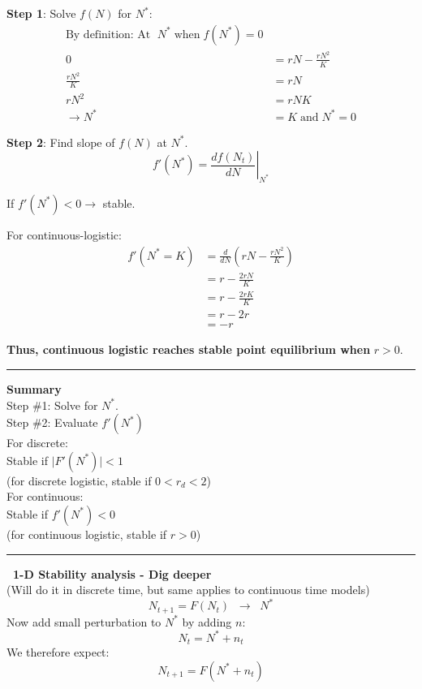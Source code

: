 \documentclass{article}
\newcommand{\ind}{\-\hspace{1cm}}
\begin{document}
\textbf{Step 1}:  Solve $f(N)$ for $N^*$:
\begin{align*}
	\text{By definition:  At }\; N^{*} \; \text{when} \; f(N^*)=0&\\
	0 & = rN-\frac{rN^2}{K}\\
	\frac{rN^2}{K}&=rN\\
	rN^2&=rNK\\
	\to N^*& = K \; \text{and} \; N^* =0	
\end{align*}

\textbf{Step 2}:  Find slope of $f(N)$ at $N^*$.  
\begin{equation*}
	f'(N^*)=\left.\frac{d f(N_t)}{dN}\right\vert_{N^*}
\end{equation*}
\begin{center}
\ind \ind If $ f'(N^*) < 0 \to$ stable.
\end{center}
\ind \ind For continuous-logistic:\\
\begin{align*}
	f'(N^*=K)&=\frac{d}{dN}\left(rN-\frac{rN^2}{K}\right)\\
	&=r-\frac{2r N}{K}\\
	&= r- \frac{2r K}{K}\\
	&= r-2r\\
	&= -r
\end{align*}

\begin{center}
\textbf{Thus, continuous logistic reaches stable point equilibrium when} $r>0$.
\end{center}

\rule[0.5ex]{\linewidth}{1pt}

\textbf{Summary}\\
Step \#1: Solve for $N^*$.\\
Step \#2: Evaluate $f'(N^*)$\\
\ind \ind For discrete:\\
\ind \ind \ind Stable if $\vert F'(N^*) \vert <1$\\
\ind \ind \ind \ind (for discrete logistic, stable if $0<r_d<2$)\\
\ind \ind For continuous:\\
\ind \ind \ind Stable if $f'(N^*) <0$\\
\ind \ind \ind \ind (for continuous logistic, stable if $r>0$)\\

\rule[0.5ex]{\linewidth}{1pt}

\textbf{ 1-D Stability analysis - Dig deeper}\\
\ind (Will do it in discrete time, but same applies to continuous time models)
\begin{equation*}
	N_{t+1}=F(N_t) \; \; \to \;\; N^*
\end{equation*}
Now add small perturbation to $N^*$ by adding $n$:
\begin{equation*}
	N_t = N^* + n_t
\end{equation*}
We therefore expect:
\begin{equation*}
	N_{t+1} = F(N^* + n_t)
\end{equation*}
\end{document}
